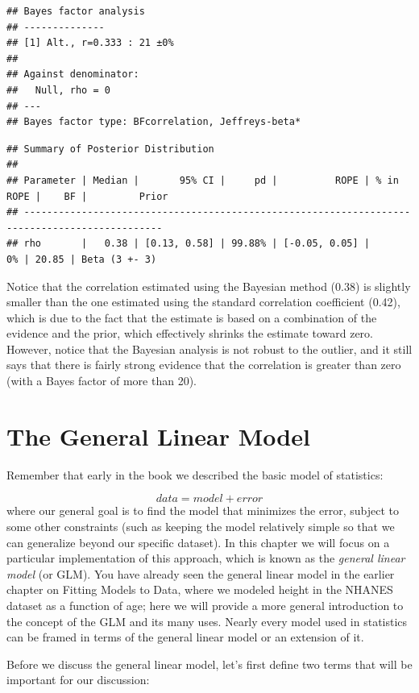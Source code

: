 \documentclass[
  12pt,
]{book}
\begin{document}
\begin{verbatim}
## Bayes factor analysis
## --------------
## [1] Alt., r=0.333 : 21 ±0%
## 
## Against denominator:
##   Null, rho = 0 
## ---
## Bayes factor type: BFcorrelation, Jeffreys-beta*
\end{verbatim}

\begin{verbatim}
## Summary of Posterior Distribution
## 
## Parameter | Median |       95% CI |     pd |          ROPE | % in ROPE |    BF |         Prior
## ----------------------------------------------------------------------------------------------
## rho       |   0.38 | [0.13, 0.58] | 99.88% | [-0.05, 0.05] |        0% | 20.85 | Beta (3 +- 3)
\end{verbatim}

Notice that the correlation estimated using the Bayesian method (0.38) is slightly smaller than the one estimated using the standard correlation coefficient (0.42), which is due to the fact that the estimate is based on a combination of the evidence and the prior, which effectively shrinks the estimate toward zero. However, notice that the Bayesian analysis is not robust to the outlier, and it still says that there is fairly strong evidence that the correlation is greater than zero (with a Bayes factor of more than 20).

\hypertarget{the-general-linear-model}{%
\chapter{The General Linear Model}\label{the-general-linear-model}}

Remember that early in the book we described the basic model of statistics:

\[
data = model + error
\]
where our general goal is to find the model that minimizes the error, subject to some other constraints (such as keeping the model relatively simple so that we can generalize beyond our specific dataset). In this chapter we will focus on a particular implementation of this approach, which is known as the \emph{general linear model} (or GLM). You have already seen the general linear model in the earlier chapter on Fitting Models to Data, where we modeled height in the NHANES dataset as a function of age; here we will provide a more general introduction to the concept of the GLM and its many uses. Nearly every model used in statistics can be framed in terms of the general linear model or an extension of it.

Before we discuss the general linear model, let's first define two terms that will be important for our discussion:
\end{document}
